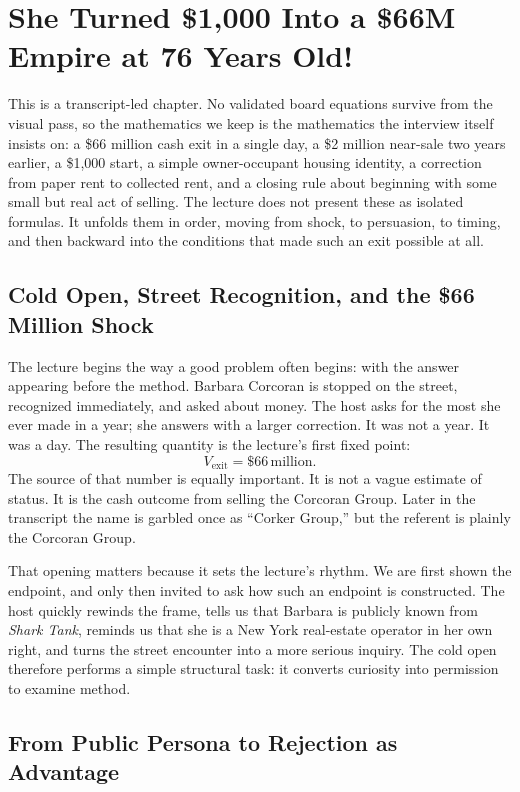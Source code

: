 \chapter{She Turned \$1{,}000 Into a \$66M Empire at 76 Years Old!}

This is a transcript-led chapter. No validated board equations survive from the visual pass, so the mathematics we keep is the mathematics the interview itself insists on: a \$66 million cash exit in a single day, a \$2 million near-sale two years earlier, a \$1{,}000 start, a simple owner-occupant housing identity, a correction from paper rent to collected rent, and a closing rule about beginning with some small but real act of selling. The lecture does not present these as isolated formulas. It unfolds them in order, moving from shock, to persuasion, to timing, and then backward into the conditions that made such an exit possible at all.

\section{Cold Open, Street Recognition, and the \$66 Million Shock}

The lecture begins the way a good problem often begins: with the answer appearing before the method. Barbara Corcoran is stopped on the street, recognized immediately, and asked about money. The host asks for the most she ever made in a year; she answers with a larger correction. It was not a year. It was a day. The resulting quantity is the lecture's first fixed point:
\begin{equation}
V_{\text{exit}}=\$66\,\text{million}.
\end{equation}
The source of that number is equally important. It is not a vague estimate of status. It is the cash outcome from selling the Corcoran Group. Later in the transcript the name is garbled once as ``Corker Group,'' but the referent is plainly the Corcoran Group.

That opening matters because it sets the lecture's rhythm. We are first shown the endpoint, and only then invited to ask how such an endpoint is constructed. The host quickly rewinds the frame, tells us that Barbara is publicly known from \emph{Shark Tank}, reminds us that she is a New York real-estate operator in her own right, and turns the street encounter into a more serious inquiry. The cold open therefore performs a simple structural task: it converts curiosity into permission to examine method.

\section{From Public Persona to Rejection as Advantage}

